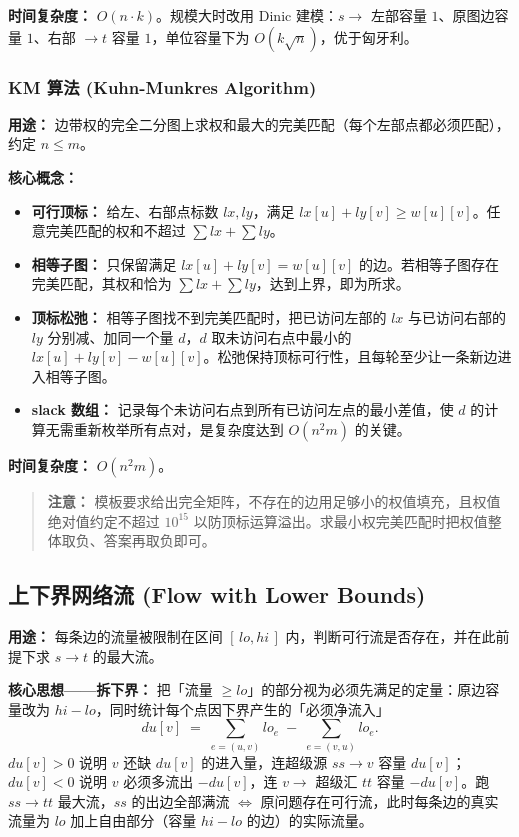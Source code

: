 \textbf{时间复杂度：} $O(n \cdot k)$。规模大时改用 Dinic 建模：$s \to$ 左部容量 $1$、原图边容量 $1$、右部 $\to t$ 容量 $1$，单位容量下为 $O(k\sqrt{n})$，优于匈牙利。



\subsubsection{KM 算法 (Kuhn-Munkres Algorithm)}

\textbf{用途：} 边带权的完全二分图上求权和最大的完美匹配（每个左部点都必须匹配），约定 $n \le m$。

\textbf{核心概念：}
\begin{itemize}
  \item \textbf{可行顶标：} 给左、右部点标数 $lx, ly$，满足 $lx[u] + ly[v] \ge w[u][v]$。任意完美匹配的权和不超过 $\sum lx + \sum ly$。
  \item \textbf{相等子图：} 只保留满足 $lx[u] + ly[v] = w[u][v]$ 的边。若相等子图存在完美匹配，其权和恰为 $\sum lx + \sum ly$，达到上界，即为所求。
  \item \textbf{顶标松弛：} 相等子图找不到完美匹配时，把已访问左部的 $lx$ 与已访问右部的 $ly$ 分别减、加同一个量 $d$，$d$ 取未访问右点中最小的 $lx[u]+ly[v]-w[u][v]$。松弛保持顶标可行性，且每轮至少让一条新边进入相等子图。
  \item \textbf{slack 数组：} 记录每个未访问右点到所有已访问左点的最小差值，使 $d$ 的计算无需重新枚举所有点对，是复杂度达到 $O(n^2 m)$ 的关键。
\end{itemize}

\textbf{时间复杂度：} $O(n^2 m)$。

\begin{quote}
\textbf{注意：} 模板要求给出完全矩阵，不存在的边用足够小的权值填充，且权值绝对值约定不超过 $10^{15}$ 以防顶标运算溢出。求最小权完美匹配时把权值整体取负、答案再取负即可。
\end{quote}



\subsection{上下界网络流 (Flow with Lower Bounds)}

\textbf{用途：} 每条边的流量被限制在区间 $[\,lo, hi\,]$ 内，判断可行流是否存在，并在此前提下求 $s \to t$ 的最大流。

\textbf{核心思想——拆下界：} 把「流量 $\ge lo$」的部分视为必须先满足的定量：原边容量改为 $hi - lo$，同时统计每个点因下界产生的「必须净流入」
\[
du[v] \;=\; \sum_{e=(u,v)} lo_e \;-\; \sum_{e=(v,u)} lo_e .
\]
$du[v] > 0$ 说明 $v$ 还缺 $du[v]$ 的进入量，连超级源 $ss \to v$ 容量 $du[v]$；$du[v] < 0$ 说明 $v$ 必须多流出 $-du[v]$，连 $v \to$ 超级汇 $tt$ 容量 $-du[v]$。跑 $ss \to tt$ 最大流，$ss$ 的出边全部满流 $\iff$ 原问题存在可行流，此时每条边的真实流量为 $lo$ 加上自由部分（容量 $hi-lo$ 的边）的实际流量。

